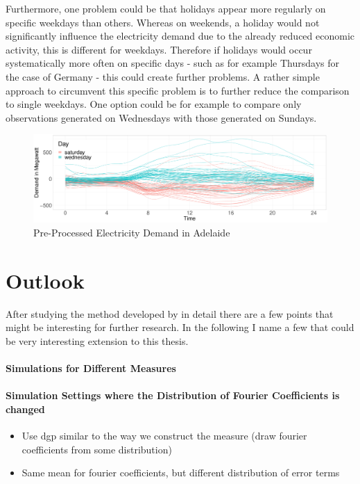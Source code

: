 \documentclass[12pt, a4paper]{article}
\theoremstyle{MAstyle} \newtheorem{assumption}{Assumption}[section]
\theoremstyle{MAstyle} \newtheorem{definition}{Definition}[section]
\begin{document}
			
			Furthermore, one problem could be that holidays appear more regularly on specific weekdays than others. Whereas on weekends, a holiday would not significantly influence the electricity demand due to the already reduced economic activity, this is different for weekdays. Therefore if holidays would occur systematically more often on specific days - such as for example Thursdays for the case of Germany - this could create further problems.
			A rather simple approach to circumvent this specific problem is to further reduce the comparison to single weekdays. One option could be for example to compare only observations generated on Wednesdays with those generated on Sundays.
			
			\begin{figure}[H]
				\includegraphics[width=\textwidth]{../Graphics/electricity_demand_curves_cleaned.PDF}
				\caption{Pre-Processed Electricity Demand in Adelaide}
				\label{electricity_demand_cleaned}
			\end{figure}
	
	\section{Outlook}\label{Outlook}
		After studying the method developed by \cite{bugni_permutation_2021} in detail there are a few points that might be interesting for further research. In the following I name a few that could be very interesting extension to this thesis.
		
		\paragraph{Simulations for Different Measures}
		
		\paragraph{Simulation Settings where the Distribution of Fourier Coefficients is changed}
			\begin{itemize}
				\item Use dgp similar to the way we construct the measure (draw fourier coefficients from some distribution)
				\item Same mean for fourier coefficients, but different distribution of error terms
			\end{itemize}
		
\end{document}
